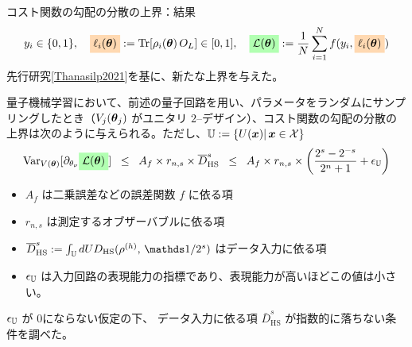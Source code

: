 \documentclass[dvipdfmx,10pt,aspectratio=169]{beamer}
\begin{document}
\begin{frame}{コスト関数の勾配の分散の上界：結果}
    \vspace*{-15pt}
    $$y_i \in \{0,1\},\quad \colorbox{orange!30}{$\ell_i(\bth)$} := \Tr[\rho_i(\bth)\,O_L] \in [0,1],\quad
    \colorbox{green!30}{$\calL(\bth)$} := \frac1N\sum_{i=1}^N f(y_i, \colorbox{orange!30}{$\ell_i(\bth)$})$$
    \vspace*{-5pt}
    先行研究{\small[\href{https://arxiv.org/abs/2110.14753v1}{Thanasilp2021}]}を基に、新たな上界を与えた。

    \begin{theorem}
        量子機械学習において、前述の量子回路を用い、パラメータをランダムにサンプリングしたとき（$V_j(\vb*{\theta}_j)$ がユニタリ $2$--デザイン）、コスト関数の勾配の分散の上界は次のように与えられる。ただし、$\mathbb{U} := \{U(\vb*{x})|\,\vb*{x}\in \mathcal{X}\}$
        \vspace*{-10pt}
        \begin{align*}
            \Var_{V(\bth)}[\pd_{\theta_\nu} \colorbox{green!30}{$\calL(\bth)$}] \;\;
            \leq\;\;
            A_f \times r_{n,s} \times \bar{D}_{\mathrm{HS}}^s \;\;
            \leq\;\;
            A_f \times r_{n,s} \times \qty(\frac{2^s-2^{-s}}{2^n+1} + \epsilon_{\bbU})
        \end{align*}
    \end{theorem}

    \begin{itemize}
        \item $A_f$ は二乗誤差などの誤差関数 $f$ に依る項
        \item $r_{n,s}$ は測定するオブザーバブルに依る項
        \item $\bar{D}_{\mathrm{HS}}^s := \int_{\bbU}dU D_{\mathrm{HS}} ( \rho^{(h)} ,\, \bbid/2^s )$ はデータ入力に依る項
        \item $\epsilon_{\mathbb{U}}$ は入力回路の表現能力の指標であり、表現能力が高いほどこの値は小さい。
    \end{itemize}

    $\epsilon_{\mathbb{U}}$ が $0$にならない仮定の下、
    データ入力に依る項 $\bar{D}_{\mathrm{HS}}^s$ が指数的に落ちない条件を調べた。
\end{frame}
\end{document}

